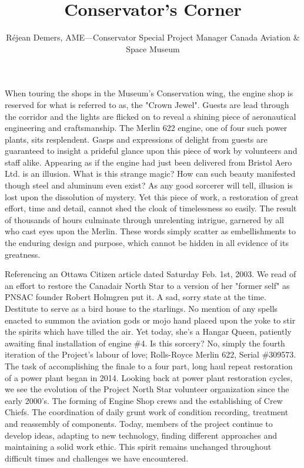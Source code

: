 %


\title{Conservator's Corner}
\author{R\'{e}jean Demers, AME---Conservator \/ Special Project Manager
Canada Aviation \& Space Museum}

\maketitle


When touring the shops in the Museum's Conservation wing, the engine shop is
reserved for what is referred to as, the "Crown Jewel". Guests are lead through
the corridor and the lights are flicked on to reveal a shining piece of
aeronautical engineering and craftsmanship. The Merlin 622 engine, one of four
such power plants, sits resplendent. Gasps and expressions of delight from
guests are guaranteed to insight a prideful glance upon this piece of work by
volunteers and staff alike. Appearing as if the engine had just been delivered
from Bristol Aero Ltd. is an illusion. What is this strange magic? How can such
beauty manifested though steel and aluminum even exist? As any good sorcerer
will tell, illusion is lost upon the dissolution of mystery. Yet this piece of
work, a restoration of great effort, time and detail, cannot shed the cloak of
timelessness so easily. The result of thousands of hours culminate through
unrelenting intrigue, garnered by all who cast eyes upon the Merlin. These
words simply scatter as embellishments to the enduring design and purpose,
which cannot be hidden in all evidence of its greatness. 

Referencing an Ottawa Citizen article dated Saturday Feb. 1st, 2003. We read of
an effort to restore the Canadair North Star to a version of her "former self"
as PNSAC founder Robert Holmgren put it. A sad, sorry state at the time.
Destitute to serve as a bird house to the starlings. No mention of any spells
enacted to summon the aviation gods or mojo hand placed upon the yoke to stir
the spirits which have tilled the air.  Yet today, she's a Hangar Queen,
patiently awaiting final installation of engine \#4. Is this sorcery? No,
simply the fourth iteration of the Project's labour of love; Rolls-Royce Merlin
622, Serial \#309573. The task of accomplishing the finale to a four part, long
haul repeat restoration of a power plant began in 2014. Looking back at power
plant restoration cycles, we see the evolution of the Project North Star
volunteer organization since the early 2000's. The forming of Engine Shop crews
and the establishing of Crew Chiefs. The coordination of daily grunt work of
condition recording, treatment and reassembly of components. Today, members of
the project continue to develop ideas, adapting to new technology, finding
different approaches and maintaining a solid work ethic. This spirit remains
unchanged throughout difficult times and challenges we have encountered. 

